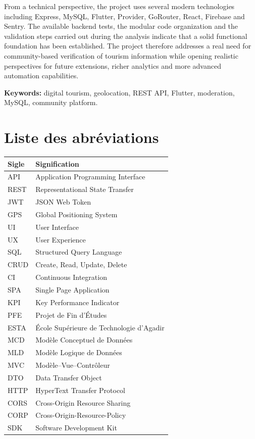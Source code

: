 ﻿\documentclass[12pt,a4paper]{report}
\begin{document}
From a technical perspective, the project uses several modern technologies including Express, MySQL, Flutter, Provider, GoRouter, React, Firebase and Sentry. The available backend tests, the modular code organization and the validation steps carried out during the analysis indicate that a solid functional foundation has been established. The project therefore addresses a real need for community-based verification of tourism information while opening realistic perspectives for future extensions, richer analytics and more advanced automation capabilities.

\noindent\textbf{Keywords:} digital tourism, geolocation, REST API, Flutter, moderation, MySQL, community platform.

\clearpage
\chapter*{Liste des abr\'eviations}
\begin{longtable}{p{3cm}p{11cm}}
\toprule
\textbf{Sigle} & \textbf{Signification} \\
\midrule
API & Application Programming Interface \\
REST & Representational State Transfer \\
JWT & JSON Web Token \\
GPS & Global Positioning System \\
UI & User Interface \\
UX & User Experience \\
SQL & Structured Query Language \\
CRUD & Create, Read, Update, Delete \\
CI & Continuous Integration \\
SPA & Single Page Application \\
KPI & Key Performance Indicator \\
PFE & Projet de Fin d'\'Etudes \\
ESTA & \'Ecole Sup\'erieure de Technologie d'Agadir \\
MCD & Mod\`ele Conceptuel de Donn\'ees \\
MLD & Mod\`ele Logique de Donn\'ees \\
MVC & Mod\`ele--Vue--Contr\^oleur \\
DTO & Data Transfer Object \\
HTTP & HyperText Transfer Protocol \\
CORS & Cross-Origin Resource Sharing \\
CORP & Cross-Origin-Resource-Policy \\
SDK & Software Development Kit \\
\bottomrule
\end{longtable}
\end{document}
